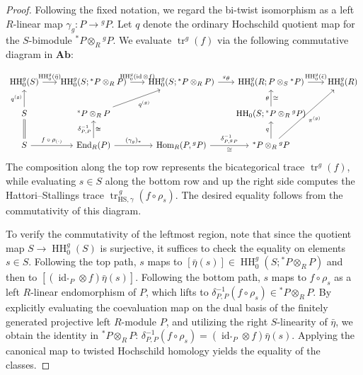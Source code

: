 \documentclass[11pt,oneside]{amsart}
\DeclareMathOperator{\Hom}{Hom}
\DeclareMathOperator{\HH}{HH}
\DeclareMathOperator{\End}{End}
\DeclareMathOperator{\id}{id}
\numberwithin{equation}{section}
\numberwithin{figure}{section}
\theoremstyle{plain}
\theoremstyle{definition}
\theoremstyle{remark}
\begin{document}
\begin{proof}
Following the fixed notation, we regard the bi-twist isomorphism as a left $R$-linear map $\gamma_g\colon P \to {}^gP$. Let $q$ denote the ordinary Hochschild quotient map for the $S$-bimodule ${}^*P \otimes_R {}^gP$. We evaluate $\operatorname{tr}^g(f)$ via the following commutative diagram in $\mathbf{Ab}$:

\begin{equation}\label{eq:trace-diagram}
\begin{tikzcd}[column sep=1.7em, row sep=2em, every label/.append style={font=\scriptsize}]
\HH_0^g(S)
  \arrow[r, "\HH_0^g(\bar{\eta})"]
& \HH_0^g(S;{}^*P\otimes_R P)
  \arrow[r, "\HH_0^g(\id\otimes{f})"]
& \HH_0^g(S;{}^*P\otimes_R P)
  \arrow[r, "{}^g\theta"]
& \HH_0^g(R;P\otimes_S {}^*P)
  \arrow[r, "\HH_0^g(\bar{\epsilon})"]
& \HH_0^g(R)
\\
S\arrow[u, "q^{(g)}"]
& {}^*P\otimes_R P
  \arrow[ur, "q^{(g)}"']
& {} 
& \HH_0(S;{}^*P \otimes_R {}^gP)\arrow[u,"\theta","\cong"']
& {}
\\
S
  \arrow[u, equal]
  \arrow[r, "f\circ \rho_{(\cdot)}"]
& \End_R(P)
  \arrow[u, "\delta^{-1}_{P,P}","\cong"']
  \arrow[r, "(\gamma_g)_*"]
& \Hom_R(P,{}^gP)
  \arrow[r, "\delta^{-1}_{P,{}^gP}", "\cong"']
& {}^*P\otimes_R {}^gP
  \arrow[u, " q"]
  \arrow[uur, "\pi^{(g)}"']
& {}
\end{tikzcd}
\end{equation}
The composition along the top row represents the bicategorical trace $\operatorname{tr}^g(f)$, while evaluating $s \in S$ along the bottom row and up the right side computes the Hattori--Stallings trace $\operatorname{tr}_{\mathrm{HS},\gamma}^{\,g}(f \circ \rho_s)$. The desired equality follows from the commutativity of this diagram.


To verify the commutativity of the leftmost region, note that since the quotient map $S \to \HH_0^g(S)$ is surjective, it suffices to check the equality on elements $s \in S$. Following the top path, $s$ maps to $[\bar{\eta}(s)] \in \HH_0^g(S; {}^*P \otimes_R P)$ and then to $[(\id_{{}^*P}\otimes f)\bar{\eta}(s)]$. Following the bottom path, 
$s$ maps to $f \circ \rho_s$ as a left
\(R\)-linear endomorphism of \(P\), which lifts to $\delta^{-1}_{P,P}(f\circ \rho_s) \in {}^*P \otimes_R P$. By explicitly evaluating the coevaluation map on the dual basis of the finitely generated projective left $R$-module $P$, and utilizing the right $S$-linearity of $\bar{\eta}$, we obtain the identity in ${}^*P \otimes_R P$:
$\delta_{P,P}^{-1}(f\circ\rho_s) = (\id_{{}^*P}\otimes f)\bar{\eta}(s)$.
Applying the canonical map to twisted Hochschild homology yields the equality of the classes.



\end{proof}
\end{document}
